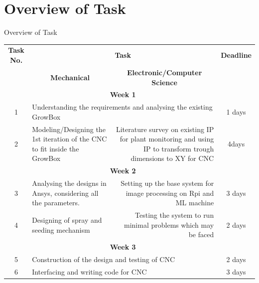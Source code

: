 \documentclass[12pt, a4paper]{beamer}
\begin{document}
\section{Overview of Task}
	\begin{frame}{Overview of Task}
\begin{table}[htbp]
  \centering
  \tiny
    \begin{tabular}{clrc}
    \multicolumn{1}{p{2em}}{\textbf{Task No.}} & \multicolumn{2}{c}{\textbf{Task}} & \textbf{Deadline} \\
          & \multicolumn{1}{c}{\textbf{Mechanical}} & \multicolumn{1}{c}{\textbf{Electronic/Computer Science}} &  \\
          & \multicolumn{2}{c}{\textbf{Week 1}} &  \\
    1     & \multicolumn{2}{l}{Understanding the requirements and analysing the existing GrowBox} & 1 days \\
    2     & \multicolumn{1}{p{13.57em}}{Modeling/Designing the 1st iteration of the CNC to fit inside the GrowBox} & \multicolumn{1}{p{13.57em}}{Literature survey on existing IP for plant monitoring and using IP to transform trough dimensions to XY for CNC} & 4days \\
          & \multicolumn{2}{c}{\textbf{Week 2}} &  \\
    3     & \multicolumn{1}{p{13.57em}}{Analysing the designs in Ansys, considering all the parameters.} & \multicolumn{1}{p{13.57em}}{Setting up the base system for image processing on Rpi and ML machine} & 3 days \\
    4     & \multicolumn{1}{p{13.57em}}{Designing of spray and seeding mechanism} & \multicolumn{1}{p{13.57em}}{Testing the system to run minimal problems which may be faced} & 2 days \\
          & \multicolumn{2}{c}{\textbf{Week 3}} &  \\
    5     & \multicolumn{2}{l}{Construction of the design and testing of CNC} & 2 days \\
    6     & \multicolumn{2}{l}{Interfacing and writing code for CNC} & 3 days \\
    \end{tabular}%
  \label{tab:addlabel}%
\end{table}%
\end{frame}
\end{document}
